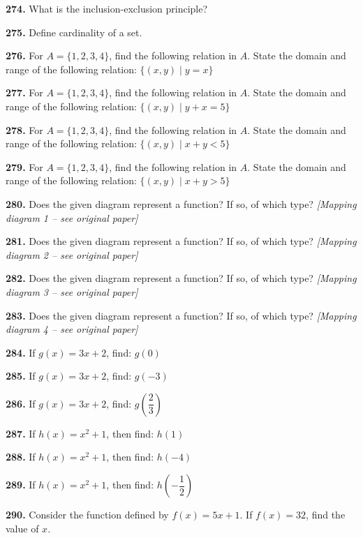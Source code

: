 \documentclass[11pt]{article}
\begin{document}
\bigskip
\noindent\textbf{274.} What is the inclusion-exclusion principle?

\bigskip
\noindent\textbf{275.} Define cardinality of a set.

\bigskip
\noindent\textbf{276.} For $A=\{1,2,3,4\}$, find the following relation in $A$. State the domain and range of the following relation: $\{(x,y)\mid y=x\}$

\bigskip
\noindent\textbf{277.} For $A=\{1,2,3,4\}$, find the following relation in $A$. State the domain and range of the following relation: $\{(x,y)\mid y+x=5\}$

\bigskip
\noindent\textbf{278.} For $A=\{1,2,3,4\}$, find the following relation in $A$. State the domain and range of the following relation: $\{(x,y)\mid x+y<5\}$

\bigskip
\noindent\textbf{279.} For $A=\{1,2,3,4\}$, find the following relation in $A$. State the domain and range of the following relation: $\{(x,y)\mid x+y>5\}$

\bigskip
\noindent\textbf{280.} Does the given diagram represent a function? If so, of which type? \emph{[Mapping diagram 1 -- see original paper]}

\bigskip
\noindent\textbf{281.} Does the given diagram represent a function? If so, of which type? \emph{[Mapping diagram 2 -- see original paper]}

\bigskip
\noindent\textbf{282.} Does the given diagram represent a function? If so, of which type? \emph{[Mapping diagram 3 -- see original paper]}

\bigskip
\noindent\textbf{283.} Does the given diagram represent a function? If so, of which type? \emph{[Mapping diagram 4 -- see original paper]}

\bigskip
\noindent\textbf{284.} If $g(x)=3x+2$, find: $g(0)$

\bigskip
\noindent\textbf{285.} If $g(x)=3x+2$, find: $g(-3)$

\bigskip
\noindent\textbf{286.} If $g(x)=3x+2$, find: $g\!\left(\dfrac{2}{3}\right)$

\bigskip
\noindent\textbf{287.} If $h(x)=x^2+1$, then find: $h(1)$

\bigskip
\noindent\textbf{288.} If $h(x)=x^2+1$, then find: $h(-4)$

\bigskip
\noindent\textbf{289.} If $h(x)=x^2+1$, then find: $h\!\left(-\dfrac{1}{2}\right)$

\bigskip
\noindent\textbf{290.} Consider the function defined by $f(x)=5x+1$. If $f(x)=32$, find the value of $x$.
\end{document}
